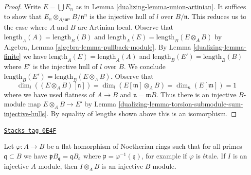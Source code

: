 \begin{proof}

Write $E = \bigcup E_n$ as in Lemma \ref{dualizing-lemma-union-artinian}.
It suffices to show that $E_n \otimes_{A/\mathfrak m^n} B/\mathfrak n^n$
is the injective hull of $l$ over $B/\mathfrak n$.
This reduces us to the case where $A$ and $B$ are Artinian local.
Observe that $\text{length}_A(A) = \text{length}_B(B)$ and
$\text{length}_A(E) = \text{length}_B(E \otimes_A B)$
by Algebra, Lemma \ref{algebra-lemma-pullback-module}.
By Lemma \ref{dualizing-lemma-finite} we have
$\text{length}_A(E) = \text{length}_A(A)$ and
$\text{length}_B(E') = \text{length}_B(B)$
where $E'$ is the injective hull of $l$ over $B$.
We conclude $\text{length}_B(E') = \text{length}_B(E \otimes_A B)$.
Observe that
$$
\dim_l((E \otimes_A B)[\mathfrak n]) =
\dim_l(E[\mathfrak m] \otimes_A B) =
\dim_\kappa(E[\mathfrak m]) = 1
$$
where we have used flatness of $A \to B$ and $\mathfrak n = \mathfrak mB$.
Thus there is an injective $B$-module map $E \otimes_A B \to E'$
by Lemma \ref{dualizing-lemma-torsion-submodule-sum-injective-hulls}.
By equality of lengths shown above this is an isomorphism.
\end{proof}

\begin{lemma}
\label{dualizing-lemma-injective-goes-up}
\href{https://stacks.math.columbia.edu/tag/0E4F}{\texttt{Stacks tag 0E4F}}

Let $\varphi : A \to B$ be a flat homorphism of Noetherian rings such
that for all primes $\mathfrak q \subset B$ we have
$\mathfrak p B_\mathfrak q = \mathfrak qB_\mathfrak q$
where $\mathfrak p = \varphi^{-1}(\mathfrak q)$, for example
if $\varphi$ is \'etale.
If $I$ is an injective $A$-module, then $I \otimes_A B$ is
an injective $B$-module.
\end{lemma}

